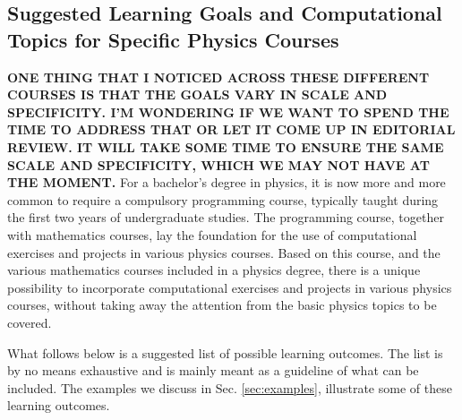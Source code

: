 \documentclass[graybox,envcountchap,sectrefs]{svmult}
\begin{document}
\subsection{Suggested Learning Goals and Computational Topics for Specific Physics Courses}
{\bf ONE THING THAT I NOTICED ACROSS THESE DIFFERENT COURSES IS THAT THE GOALS VARY IN SCALE AND SPECIFICITY. I'M WONDERING IF WE WANT TO SPEND THE TIME TO ADDRESS THAT OR LET IT COME UP IN EDITORIAL REVIEW. IT WILL TAKE SOME TIME TO ENSURE THE SAME SCALE AND SPECIFICITY, WHICH WE MAY NOT HAVE AT THE MOMENT.}
For a bachelor's degree in physics, it is now more and more common to require a compulsory
programming course, typically taught during the first two years of
undergraduate studies. The programming course, together with
mathematics courses, lay the foundation for the use of computational
exercises and projects in various physics courses. Based on this
course, and the various mathematics courses included in a physics
degree, there is a unique possibility to incorporate computational
exercises and projects in various physics courses, without taking away
the attention from the basic physics topics to be covered.

What follows below is a suggested list of possible learning
outcomes. The list is by no means exhaustive and is mainly meant as a
guideline of what can be included. The examples we discuss in Sec. \ref{sec:examples}, illustrate some of these learning outcomes.
\end{document}
